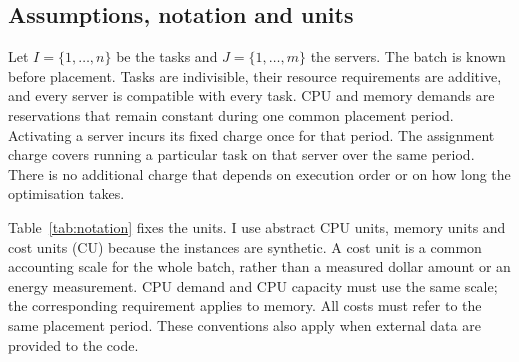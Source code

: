 \documentclass[10pt,a4paper]{article}
\begin{document}
\subsection{Assumptions, notation and units}

Let $I=\{1,\ldots,n\}$ be the tasks and $J=\{1,\ldots,m\}$ the servers.
The batch is known before placement. Tasks are indivisible, their resource
requirements are additive, and every server is compatible with every task.
CPU and memory demands are reservations that remain constant during one common
placement period. Activating a server incurs its fixed charge once for that
period. The assignment charge covers running a particular task on that server
over the same period. There is no additional charge that depends on execution
order or on how long the optimisation takes.

Table~\ref{tab:notation} fixes the units. I use abstract CPU units, memory units
and cost units (CU) because the instances are synthetic. A cost unit is a common
accounting scale for the whole batch, rather than a measured dollar amount or
an energy measurement. CPU demand and CPU capacity must use the same scale;
the corresponding requirement applies to memory. All costs must refer to the
same placement period. These conventions also apply when external data are
provided to the code.
\end{document}
